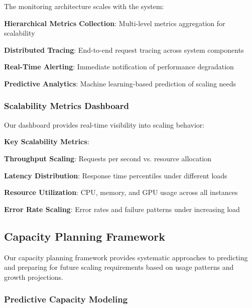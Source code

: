 The monitoring architecture scales with the system:

\begin{expandedlist}
    \item \textbf{Hierarchical Metrics Collection}: Multi-level metrics aggregation for scalability
    \item \textbf{Distributed Tracing}: End-to-end request tracing across system components
    \item \textbf{Real-Time Alerting}: Immediate notification of performance degradation
    \item \textbf{Predictive Analytics}: Machine learning-based prediction of scaling needs
\end{expandedlist}

\subsubsection*{Scalability Metrics Dashboard}

Our dashboard provides real-time visibility into scaling behavior:

\begin{alertbox}
\textbf{Key Scalability Metrics}:
\begin{compactlist}
    \item \textbf{Throughput Scaling}: Requests per second vs. resource allocation
    \item \textbf{Latency Distribution}: Response time percentiles under different loads
    \item \textbf{Resource Utilization}: CPU, memory, and GPU usage across all instances
    \item \textbf{Error Rate Scaling}: Error rates and failure patterns under increasing load
\end{compactlist}
\end{alertbox}

\subsection*{Capacity Planning Framework}

Our capacity planning framework provides systematic approaches to predicting and preparing for future scaling requirements based on usage patterns and growth projections.

\subsubsection*{Predictive Capacity Modeling}

